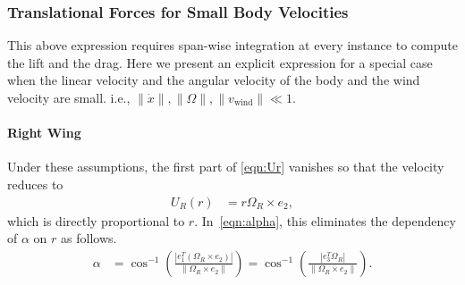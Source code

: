 \documentclass[10pt]{article}
\begin{document}
\subsubsection{Translational Forces for Small Body Velocities}

This above expression requires span-wise integration at every instance to compute the lift and the drag. 
Here we present an explicit expression for a special case when the linear velocity and the angular velocity of the body and the wind velocity are small. i.e., $\|\dot x\|, \|\Omega\|, \|v_{\mathrm{wind}}\| \ll 1$.  

\paragraph{Right Wing}

Under these assumptions, the first part of \eqref{eqn:Ur} vanishes so that the velocity reduces to 
\begin{align*}
    U_R(r) & = r \Omega_R \times e_2,
\end{align*}
which is directly proportional to $r$. 
In~\eqref{eqn:alpha}, this eliminates the dependency of $\alpha$  on $r$ as follows.
\begin{align*}
    \alpha & = \cos^{-1} (\frac{ |e_1^T (\Omega_R \times e_2)|}{\|\Omega_R\times e_2\|}) = \cos^{-1} (\frac{ |e_3^T \Omega_R |}{\|\Omega_R \times e_2\|} ).
\end{align*}
\end{document}
